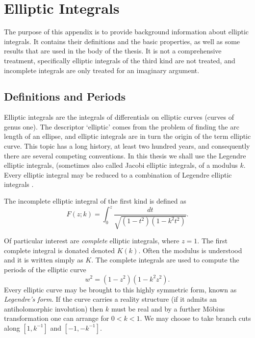 
\section{Elliptic Integrals}
\label{sec:Elliptic Integrals}

\stoptocentries

The purpose of this appendix is to provide background information about elliptic integrals. It contains their definitions and the basic properties, as well as some results that are used in the body of the thesis. It is not a comprehensive treatment, specifically elliptic integrals of the third kind are not treated, and incomplete integrals are only treated for an imaginary argument.

\subsection{Definitions and Periods}
Elliptic integrals are the integrals of differentials on elliptic curves (curves of genus one). The descriptor `elliptic' comes from the problem of finding the arc length of an ellipse, and elliptic integrals are in turn the origin of the term elliptic curve. This topic has a long history, at least two hundred years, and consequently there are several competing conventions. In this thesis we shall use the Legendre elliptic integrals, (sometimes also called Jacobi elliptic integrals, of a modulus $k$. Every elliptic integral may be reduced to a combination of Legendre elliptic integrals \cite{armitage2006elliptic}.

\begin{defn}
The incomplete elliptic integral of the first kind is defined as
\[
F(z;k) = \int_0^z \frac{dt}{\sqrt{(1-t^2)(1-k^2 t^2)}}.
\]
\end{defn}

Of particular interest are \emph{complete} elliptic integrals, where $z=1$. The first complete integral is donated denoted $K(k)$. Often the modulus is understood and it is written simply as $K$. The complete integrals are used to compute the periods of the elliptic curve
\[
w^2 = (1-z^2)(1-k^2 z^2).
\]
Every elliptic curve may be brought to this highly symmetric form, known as {\it Legendre's form}. If the curve carries a reality structure (if it admits an antiholomorphic involution) then $k$ must be real and by a further M\"obius transformation one can arrange for $0 < k < 1$. We may choose to take branch cuts along $[1,k^{-1}]$ and $[-1,-k^{-1}]$.


